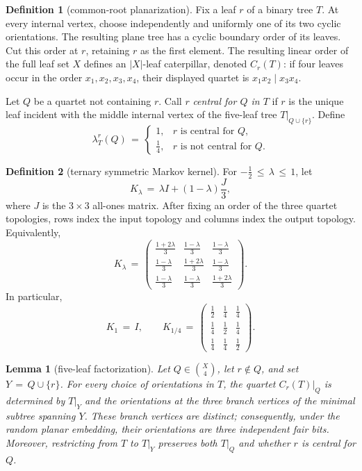 \documentclass[11pt]{article}
\newtheorem{lemma}[theorem]{Lemma}
\theoremstyle{definition}
\newtheorem{definition}{Definition}
\begin{document}
\begin{definition}[common-root planarization]\label{def:planarization}
Fix a leaf $r$ of a binary tree $T$.  At every internal vertex, choose
independently and uniformly one of its two cyclic orientations.  The
resulting plane tree has a cyclic boundary order of its leaves.  Cut this
order at $r$, retaining $r$ as the first element.  The resulting linear
order of the full leaf set $X$ defines an $|X|$-leaf caterpillar, denoted
$C_r(T)$: if four leaves occur in the order $x_1,x_2,x_3,x_4$, their
displayed quartet is $x_1x_2\mid x_3x_4$.

Let $Q$ be a quartet not containing $r$.  Call $r$ \emph{central for
$Q$ in $T$} if $r$ is the unique leaf incident with the middle internal
vertex of the five-leaf tree $T|_{Q\cup\{r\}}$.  Define
\begin{equation}\label{eq:lambda}
 \lambda_T^r(Q)\,=\,
 \begin{cases}
  1,&r\text{ is central for }Q,\\
  \frac14,&r\text{ is not central for }Q.
 \end{cases}
\end{equation}
\end{definition}

\begin{definition}[ternary symmetric Markov kernel]\label{def:symmetric-kernel}
For $-\frac12\,\leq\,\lambda\,\leq\,1$, let
\[
 K_\lambda\,=\,\lambda I+(1-\lambda)\frac{J}{3},
\]
where $J$ is the $3\times3$ all-ones matrix.  After fixing an order of the
three quartet topologies, rows index the input topology and columns index
the output topology.  Equivalently,
\[
 K_\lambda
 \,=\,
 \begin{pmatrix}
  \frac{1+2\lambda}{3} & \frac{1-\lambda}{3} & \frac{1-\lambda}{3}\\
  \frac{1-\lambda}{3} & \frac{1+2\lambda}{3} & \frac{1-\lambda}{3}\\
  \frac{1-\lambda}{3} & \frac{1-\lambda}{3} & \frac{1+2\lambda}{3}
 \end{pmatrix}.
\]
In particular,
\[
 K_1\,=\,I,
 \qquad
 K_{1/4}
 \,=\,
 \begin{pmatrix}
  \frac12 & \frac14 & \frac14\\
  \frac14 & \frac12 & \frac14\\
  \frac14 & \frac14 & \frac12
 \end{pmatrix}.
\]
\end{definition}

\begin{lemma}[five-leaf factorization]\label{lem:five-leaf-factorization}
Let $Q\in\binom X4$, let $r\notin Q$, and set $Y\,=\,Q\cup\{r\}$.
For every choice of orientations in $T$, the quartet
$C_r(T)|_Q$ is determined by $T|_Y$ and the orientations at the three
branch vertices of the minimal subtree spanning $Y$.  These branch
vertices are distinct; consequently, under the random planar embedding,
their orientations are three independent fair bits.  Moreover,
restricting from $T$ to $T|_Y$ preserves both $T|_Q$ and whether $r$ is
central for $Q$.
\end{lemma}
\end{document}
